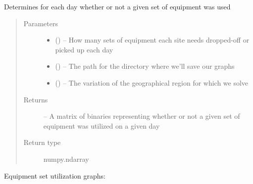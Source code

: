 \documentclass[letterpaper,10pt,english]{sphinxmanual}
\begin{document}
\begin{fulllineitems}
\label{\detokenize{reporting:reporting.equipment_usage_analysis}}
Determines for each day whether or not a given set of equipment was
used
\begin{quote}\begin{description}
\item[{Parameters}] \leavevmode\begin{itemize}
\item {} 
 () -- How many sets of equipment each site needs dropped-off or picked up
each day

\item {} 
 () -- The path for the directory where we'll save our graphs

\item {} 
 () -- The variation of the geographical region for which we solve

\end{itemize}

\item[{Returns}] \leavevmode
{} -- A matrix of binaries representing whether or not a given set of
equipment was utilized on a given day

\item[{Return type}] \leavevmode
numpy.ndarray

\end{description}\end{quote}

\end{fulllineitems}


Equipment set utilization graphs:
\end{document}
